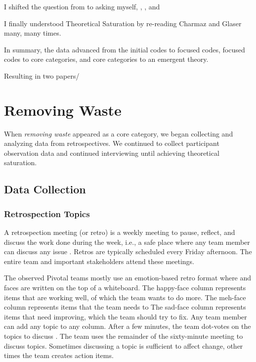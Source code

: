 I shifted the question from  to asking myself, , , and 

I finally understood Theoretical Saturation by re-reading Charmaz and Glaser many, many times. 


In summary, the data advanced from the initial codes to focused codes, focused codes to core categories, and core categories to an emergent theory. 

Resulting in two papers\cite{SedanoSustainableSoftware, SedanoTeamCodeOwnership}/

\section{Removing Waste}
\label{RemovingWaste}

When \textit{removing waste} appeared as a core category, we began collecting and analyzing data from retrospectives. We continued to collect participant observation data and continued interviewing until achieving theoretical saturation. 



\subsection{Data Collection}
\subsubsection{Retrospection Topics}
A retrospection meeting (or retro) is a weekly meeting to pause, reflect, and discuss the work done during the week, i.e., a safe place where any team member can discuss any issue \cite{DerbyAgileRetrospectives}. Retros are typically scheduled every Friday afternoon. The entire team and important stakeholders attend these meetings. 

The observed Pivotal teams mostly use an emotion-based retro format where   and  faces are written on the top of a whiteboard. The happy-face column represents items that are working well, of which the team wants to do more. The meh-face column represents  items that the team needs to  The sad-face column represents items that need improving, which the team should try to fix. Any team member can add any topic to any column. After a few minutes, the team dot-votes on the topics to discuss \cite{DerbyAgileRetrospectives}. The team uses the remainder of the sixty-minute meeting to discuss topics. Sometimes discussing a topic is sufficient to affect change, other times the team creates action items. 

